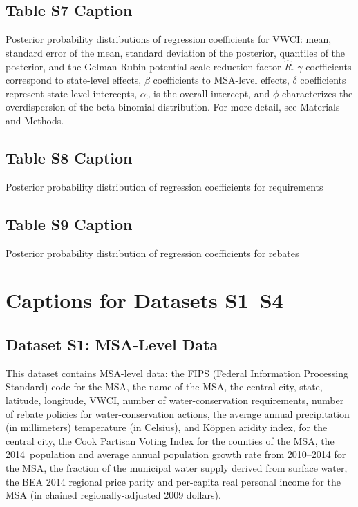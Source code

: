 \documentclass[draft]{agujournal}
\begin{document}
\subsection*{Table S7 Caption}
\begin{table}[H]
\centering
\caption{Posterior probability distributions of regression coefficients for VWCI: mean, standard error of the mean, standard deviation of the posterior, quantiles of the posterior, and the Gelman-Rubin potential scale-reduction factor $\hat R$. $\gamma$ coefficients correspond to state-level effects, $\beta$ coefficients to MSA-level effects, $\delta$ coefficients represent state-level intercepts, $\alpha_0$ is the overall intercept, and $\phi$ characterizes the overdispersion of the beta-binomial distribution. For more detail, see Materials and Methods.}
\label{tab:vwci_posterior}
\end{table}


\subsection*{Table S8 Caption}
\begin{table}[H]
\centering
\caption{Posterior probability distribution of regression coefficients for requirements}
\label{tab:req_posterior}
\end{table}


\subsection*{Table S9 Caption}
\begin{table}[H]
\centering
\caption{Posterior probability distribution of regression coefficients for rebates}
\label{tab:reb_posterior}
\end{table}



\section*{Captions for Datasets S1--S4}

\subsection*{Dataset S1: MSA-Level Data}

This dataset contains MSA-level data: the FIPS (Federal Information Processing Standard) code for the MSA,
the name of the MSA, the central city, state, latitude, longitude,
VWCI, number of water-conservation requirements, number of rebate policies for water-conservation actions,
the average annual precipitation (in millimeters) temperature (in Celsius), and K\"oppen aridity index, for the central city,
the Cook Partisan Voting Index for the counties of the MSA,
the 2014~population and average annual population growth rate from 2010--2014 for the MSA,
the fraction of the municipal water supply derived from surface water,
the BEA 2014 regional price parity and per-capita real personal income for the MSA (in chained regionally-adjusted 2009 dollars).
\end{document}
